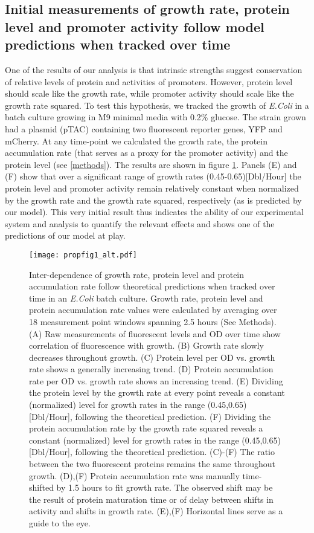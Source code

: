\documentclass[a4page,notitlepage]{article}
\begin{document}
\subsection{Initial measurements of growth rate, protein level and promoter activity follow model predictions when tracked over time}
One of the results of our analysis is that intrinsic strengths suggest conservation of relative levels of protein and activities of promoters.
However, protein level should scale like the growth rate, while promoter activity should scale like the growth rate squared.
To test this hypothesis, we tracked the growth of \emph{E.Coli} in a batch culture growing in M9 minimal media with 0.2\% glucose.
The strain grown had a plasmid (pTAC) containing two fluorescent reporter genes, YFP and mCherry.
At any time-point we calculated the growth rate, the protein accumulation rate (that serves as a proxy for the promoter activity) and the protein level (see \ref{methods}).
The results are shown in figure \ref{time-gr-fig}.
Panels (E) and (F) show that over a significant range of growth rates (0.45-0.65)[Dbl/Hour] the protein level and promoter activity remain relatively constant when normalized by the growth rate and the growth rate squared, respectively (as is predicted by our model).
This very initial result thus indicates the ability of our experimental system and analysis to quantify the relevant effects and shows one of the predictions of our model at play.
\begin{figure}[h]
\texttt{[image: propfig1\_alt.pdf]}
\caption{Inter-dependence of growth rate, protein level and protein accumulation rate follow theoretical predictions when tracked over time in an \emph{E.Coli} batch culture.
Growth rate, protein level and protein accumulation rate values were calculated by averaging over 18 measurement point windows spanning 2.5 hours (See Methods).
(A) Raw measurements of fluorescent levels and OD over time show correlation of fluorescence with growth.
(B) Growth rate slowly decreases throughout growth.
(C) Protein level per OD vs. growth rate shows a generally increasing trend.
(D) Protein accumulation rate per OD vs. growth rate shows an increasing trend.
(E) Dividing the protein level by the growth rate at every point reveals a constant (normalized) level for growth rates in the range (0.45,0.65)[Dbl/Hour], following the theoretical prediction.
(F) Dividing the protein accumulation rate by the growth rate squared reveals a constant (normalized) level for growth rates in the range (0.45,0.65)[Dbl/Hour], following the theoretical prediction.
(C)-(F) The ratio between the two fluorescent proteins remains the same throughout growth.
(D),(F) Protein accumulation rate was manually time-shifted by 1.5 hours to fit growth rate.
The observed shift may be the result of protein maturation time or of delay between shifts in activity and shifts in growth rate.
(E),(F) Horizontal lines serve as a guide to the eye.
}
\label{time-gr-fig}
\end{figure}
\end{document}
